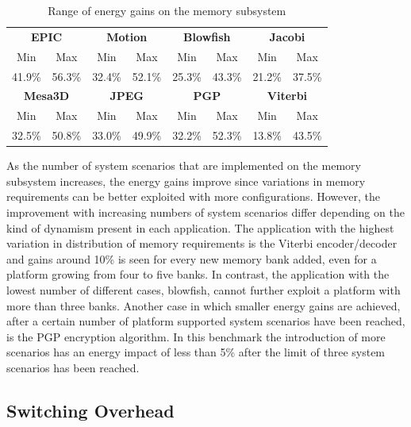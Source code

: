 \documentclass[smallextended]{svjour3}
\begin{document}
\begin{center}
	\begin{table}
	\caption{Range of energy gains on the memory subsystem}
	\label{tab:ranges}
	{
	\begin{tabular}{|c|c|c|c|c|c|c|c|}
		\hline
		\multicolumn{2}{|c|}{\textbf{EPIC}} &
		\multicolumn{2}{c|}{\textbf{Motion}} &
		\multicolumn{2}{c|}{\textbf{Blowfish}} &
		\multicolumn{2}{c|}{\textbf{Jacobi}}
		\\ 
		\cline{1-8}
		Min & Max & Min & Max & Min & Max & 
		Min & Max \\ 
		\hline 
		41.9\% & 56.3\% & 32.4\% & 52.1\% & 25.3\% & 43.3\% & 
		21.2\% & 37.5\% \\ 
		\hline 

		\multicolumn{2}{|c|}{\textbf{Mesa3D}} &
		\multicolumn{2}{c|}{\textbf{JPEG}} &
		\multicolumn{2}{c|}{\textbf{PGP}} &
		\multicolumn{2}{c|}{\textbf{Viterbi}} \\ 
		\cline{1-8}
		Min & Max & Min & Max & Min & Max & 
		Min & Max \\ 
		\hline 
		32.5\% & 50.8\% & 33.0\% & 49.9\% & 
		32.2\% & 52.3\% & 13.8\% & 43.5\% \\ 
		\hline 
		
	\end{tabular}}
	\end{table}
\end{center}

As the number of system scenarios that are implemented on the memory subsystem increases, the energy gains improve since variations in memory requirements can be better exploited with more configurations. 
However, the improvement with increasing numbers of system scenarios differ depending on the kind of dynamism present in each application. 
The application with the highest variation in distribution of memory requirements is the Viterbi encoder/decoder and gains around 10\% is seen for every new memory bank added, even for a platform growing from four to five banks. 
In contrast, the application with the lowest number of different cases, blowfish, cannot further exploit a platform with more than three banks. 
Another case in which smaller energy gains are achieved, after a certain number of platform supported system scenarios have been reached, is the PGP encryption algorithm. 
In this benchmark the introduction of more scenarios has an energy impact of less than 5\% after the limit of three system scenarios has been reached. 

\subsection{Switching Overhead}
\end{document}
